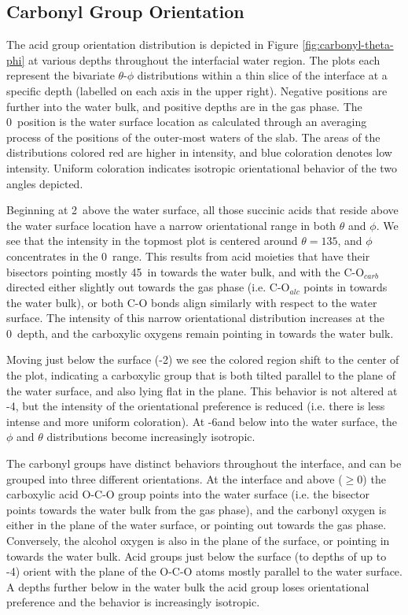 \subsection*{Carbonyl Group Orientation}

The acid group orientation distribution is depicted in Figure \ref{fig:carbonyl-theta-phi} at various depths throughout the interfacial water region. The plots each represent the bivariate $\theta$-$\phi$ distributions within a thin slice of the interface at a specific depth (labelled on each axis in the upper right). Negative positions are further into the water bulk, and positive depths are in the gas phase. The 0\angs~position is the water surface location as calculated through an averaging process of the positions of the outer-most waters of the slab. The areas of the distributions colored red are higher in intensity, and blue coloration denotes low intensity. Uniform coloration indicates isotropic orientational behavior of the two angles depicted.

Beginning at 2\angs~above the water surface, all those succinic acids that reside above the water surface location have a narrow orientational range in both $\theta$ and $\phi$. We see that the intensity in the topmost plot is centered around $\theta=135$\textdegree, and $\phi$ concentrates in the 0\textdegree~range. This results from acid moieties that have their bisectors pointing mostly 45\textdegree~in towards the water bulk, and with the C-O$_{carb}$ directed either slightly out towards the gas phase (i.e. C-O$_{alc}$ points in towards the water bulk), or both C-O bonds align similarly with respect to the water surface. The intensity of this narrow orientational distribution increases at the 0\angs~depth, and the carboxylic oxygens remain pointing in towards the water bulk.

Moving just below the surface (-2\angs) we see the colored region shift to the center of the plot, indicating a carboxylic group that is both tilted parallel to the plane of the water surface, and also lying flat in the plane. This behavior is not altered at -4\angs, but the intensity of the orientational preference is reduced (i.e. there is less intense and more uniform coloration). At -6\angs and below into the water surface, the $\phi$ and $\theta$ distributions become increasingly isotropic.

The carbonyl groups have distinct behaviors throughout the interface, and can be grouped into three different orientations. At the interface and above ($\geq 0$\angs) the carboxylic acid O-C-O group points into the water surface (i.e. the bisector points towards the water bulk from the gas phase), and the carbonyl oxygen is either in the plane of the water surface, or pointing out towards the gas phase. Conversely, the alcohol oxygen is also in the plane of the surface, or pointing in towards the water bulk. Acid groups just below the surface (to depths of up to -4\angs) orient with the plane of the O-C-O atoms mostly parallel to the water surface. A depths further below in the water bulk the acid group loses orientational preference and the behavior is increasingly isotropic.

